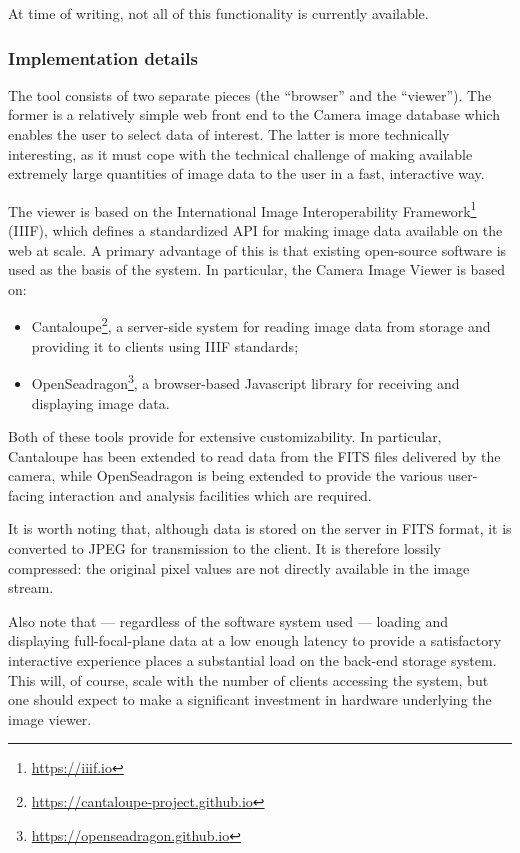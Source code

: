 At time of writing, not all of this functionality is currently available.

\subsubsection{Implementation details}

The tool consists of two separate pieces (the ``browser'' and the ``viewer'').
The former is a relatively simple web front end to the Camera image database which enables the user to select data of interest.
The latter is more technically interesting, as it must cope with the technical challenge of making available extremely large quantities of image data to the user in a fast, interactive way.

The viewer is based on the International Image Interoperability Framework\footnote{\url{https://iiif.io}} (IIIF), which defines a standardized API for making image data available on the web at scale.
A primary advantage of this is that existing open-source software is used as the basis of the system.
In particular, the Camera Image Viewer is based on:

\begin{itemize}

  \item{Cantaloupe\footnote{\url{https://cantaloupe-project.github.io}}, a server-side system for reading image data from storage and providing it to clients using IIIF standards;}
  \item{OpenSeadragon\footnote{\url{https://openseadragon.github.io}}, a browser-based Javascript library for receiving and displaying image data.}

\end{itemize}

Both of these tools provide for extensive customizability.
In particular, Cantaloupe has been extended to read data from the FITS files delivered by the camera, while OpenSeadragon is being extended to provide the various user-facing interaction and analysis facilities which are required.

It is worth noting that, although data is stored on the server in FITS format, it is converted to JPEG for transmission to the client.
It is therefore lossily compressed: the original pixel values are not directly available in the image stream.

Also note that --- regardless of the software system used --- loading and displaying full-focal-plane data at a low enough latency to provide a satisfactory interactive experience places a substantial load on the back-end storage system.
This will, of course, scale with the number of clients accessing the system, but one should expect to make a significant investment in hardware underlying the image viewer.

